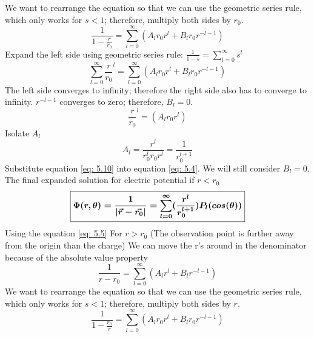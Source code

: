 \documentclass[12pt]{article}
\begin{document}
    We want to rearrange the equation so that we can use the geometric series rule, which only works for $s<1$; therefore, multiply both sides by $r_0$. 
    \begin{equation} \label{eq: 5.7}
        \frac{1}{1 - \frac{r}{r_0}} = \sum_{l=0}^{\infty} (A_l r_0 r^l + B_l r_0 r^{-l-1})
    \end{equation}
    Expand the left side using geometric series rule: $\frac{1}{1-s} = \sum_{l=0}^{\infty} s^l$
    \begin{equation} \label{eq: 5.8}
        \sum_{l=0}^{\infty} {\frac{r}{r_0}}^l =\sum_{l=0}^{\infty} (A_l r_0 r^l + B_l r_0 r^{-l-1})
    \end{equation}
    The left side converges to infinity; therefore the right side also has to converge to infinity. $r^{-l-1}$ converges to zero; therefore, $B_l=0$.
    \begin{equation} \label{eq: 5.9}
        {\frac{r}{r_0}}^l = (A_l r_0 r^l)
    \end{equation}
    Isolate $A_l$
    \begin{equation} \label{eq: 5.10}
        A_l = \frac{r^l}{r_0^l r_0 r^l} = \frac{1}{r_0^{l+1}}
    \end{equation}
    Substitute equation \ref{eq: 5.10} into equation \ref{eq: 5.4}. We will still consider $B_l=0$. 
    \newline The final expanded solution for electric potential if $\boxed{r<r_0}$
    \begin{equation} \label{eq: 5.11}
        \boxed{\boldsymbol{\Phi(r,\theta) = \frac{1}{\abs{\vec{r} - \vec{r_0}}} = \sum_{l=0}^{\infty} (\frac{r^l}{r_0^{l+1}}) P_l (cos(\theta))}}
    \end{equation}
    Using the equation \ref{eq: 5.5} For $r>r_0$ (The observation point is further away from the origin than the charge)
    \newline We can move the r's around in the denominator because of the absolute value property
    \begin{equation} \label{eq: 5.12}
        \frac{1}{r - r_0} = \sum_{l=0}^{\infty} (A_l r^l + B_l r^{-l-1})
    \end{equation}
    We want to rearrange the equation so that we can use the geometric series rule, which only works for $s<1$; therefore, multiply both sides by $r$.
    \begin{equation} \label{eq: 5.13}
        \frac{1}{1 - \frac{r_0}{r}} = \sum_{l=0}^{\infty} (A_l r_0 r^l + B_l r_0 r^{-l-1})
    \end{equation}
\end{document}

